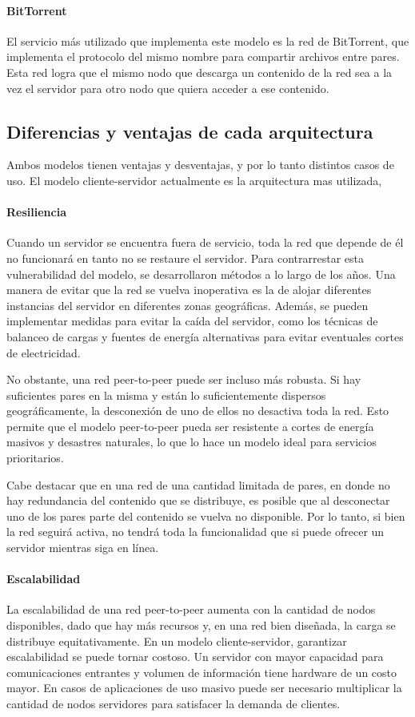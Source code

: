 \paragraph{BitTorrent} El servicio más utilizado que implementa este modelo es la red de BitTorrent, que implementa el protocolo del mismo nombre para compartir archivos entre pares. Esta red logra que el mismo nodo que descarga un contenido de la red sea a la vez el servidor para otro nodo que quiera acceder a ese contenido. 

\subsection{Diferencias y ventajas de cada arquitectura}
Ambos modelos tienen ventajas y desventajas, y por lo tanto distintos casos de uso. El modelo cliente-servidor actualmente es la arquitectura mas utilizada,

\paragraph{Resiliencia}
Cuando un servidor se encuentra fuera de servicio, toda la red que depende de él no funcionará en tanto no se restaure el servidor. Para contrarrestar esta vulnerabilidad del modelo, se desarrollaron métodos a lo largo de los años. Una manera de evitar que la red se vuelva inoperativa es la de alojar diferentes instancias del servidor en diferentes zonas geográficas. Además, se pueden implementar medidas para evitar la caída del servidor, como los técnicas de balanceo de cargas y fuentes de energía alternativas para evitar eventuales cortes de electricidad.

No obstante, una red peer-to-peer puede ser incluso más robusta. Si hay suficientes pares en la misma y están lo suficientemente dispersos geográficamente, la desconexión de uno de ellos no desactiva toda la red. Esto permite que el modelo peer-to-peer pueda ser resistente a cortes de energía masivos y desastres naturales, lo que lo hace un modelo ideal para servicios prioritarios.

Cabe destacar que en una red de una cantidad limitada de pares, en donde no hay redundancia del contenido que se distribuye, es posible que al desconectar uno de los pares parte del contenido se vuelva no disponible. Por lo tanto, si bien la red seguirá activa, no tendrá toda la funcionalidad que si puede ofrecer un servidor mientras siga en línea.

\paragraph{Escalabilidad}
La escalabilidad de una red peer-to-peer aumenta con la cantidad de nodos disponibles, dado que hay más recursos y, en una red bien diseñada, la carga se distribuye equitativamente. En un modelo cliente-servidor, garantizar escalabilidad se puede tornar costoso. Un servidor con mayor capacidad para comunicaciones entrantes y volumen de información tiene hardware de un costo mayor. En casos de aplicaciones de uso masivo puede ser necesario multiplicar la cantidad de nodos servidores para satisfacer la demanda de clientes.


